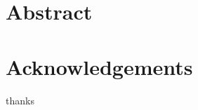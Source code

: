 \newcommand{\ccheckmark}{\mbox{\ooalign{$\checkmark$\cr\hidewidth$\square$\hidewidth\cr}}}
\newcommand{\ccheckbox}{\mbox{$\square$}}

\newcommand{\addemptypage}{\newpage\null\thispagestyle{empty}\newpage}

\newcommand{\tbd}{--}

\newcommand{\plotslot}[1]{%
  \begin{center}\setlength{\fboxsep}{8pt}%
  \fbox{\parbox[c][2.8cm][c]{0.88\textwidth}{\centering\itshape Figure placeholder --- insert plot: #1}}%
  \end{center}}

\titleformat{\section}[hang]{\huge\bfseries}{\thesection\hspace{20pt}}{0pt}{\huge\bfseries}
\graphicspath{{figures/}{./}{assets/}}




\fancyhead{}
\fancyhead[R]{\footnotesize \thesistitle}
\fancyfoot{}
\fancyfoot[R]{\thepage}
\fancyfoot[C]{\authorname}
\renewcommand{\headrulewidth}{0.4pt}
\renewcommand{\footrulewidth}{0.4pt}

\pagestyle{empty}
\hypersetup{pageanchor=false} %



\newpage
{}
\setcounter{page}{1}

\section*{Abstract}


\newpage

\vfill




\vfill

\newpage

\section*{Acknowledgements}
thanks


